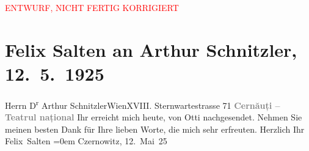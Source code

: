 
\begin{center}
            \textcolor{red}{ENTWURF, NICHT FERTIG KORRIGIERT}
                      \end{center}
            
         
         \renewcommand{\erwaehntePersonen}{Personen: Ottilie Salten}
         \renewcommand{\erwaehnteOrte}{Orte: Czernowitz, Olha-Kobyljanska-Stadttheater, Sternwartestraße, Wien}
         \renewcommand{\erwaehnteWerke}{}
               \section[Felix Salten an Arthur Schnitzler, 12. 5. 1925]{ Felix Salten an Arthur Schnitzler, 12. 5. 1925}\nopagebreak{}\rehead{ }\begin{ledgroupsized}[t]{13cm}\normalsize\beginnumbering \toendnotes[C]{\smallbreak\pagebreak[2]} 
\toendnotes[C]{\smallbreak}\pstart{}{\pb}Herrn D\textsuperscript{r} Arthur Schnitzler\pend{}\pstart{}Wien\pend{}\pstart{}XVIII. Sternwartestrasse 71\pend{}{\bigskip}\pstart
           \noindent{}\centering{}{\pb}\textcolor{gray}{\textbf{Cernăuți – Teatrul
                        național}}\pend
           \pstart
           {\pb}Ihr \label{K_L03584-1v}\label{K_L03584-1h} erreicht mich heute,
               von Otti nachgesendet. Nehmen Sie meinen
               besten Dank für Ihre lieben Worte, die mich sehr erfreuten. \pend
           \pstart
           Herzlich Ihr {\\[\baselineskip]}\spacefill\mbox{Felix Salten}\pend
           \leftskip=0em{}\pstart
           Czernowitz, 12. Mai 25\pend
           
         
         \endnumbering{}\end{ledgroupsized}\begin{anhang}\end{anhang}\newcommand{\dateiname}{L03584}\newcommand{\titel}{Felix Salten an Arthur Schnitzler, 12. 5. 1925}\newcommand{\editorInnen}{Martin Anton Müller und Laura Untner}
      